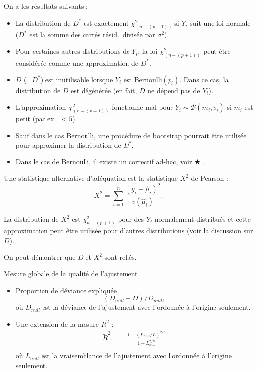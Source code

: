 \documentclass{BeamerTemplate}
\begin{document}
\begin{refsection}
\begin{frame}{}
\end{frame}


\begin{frame}{}
On a les résultats suivants :
\begin{itemize}
\item La distribution de $D^*$ est exactement
$\chi^2_{(n-(p+1))}$ si $Y_i$ suit une loi normale ($D^*$ est la somme des carrés résid.\ 
divisée par $\sigma^2$). 
\item Pour certaines autres distributions de $Y_i$, la loi $\chi^2_{(n-(p+1))}$ peut être considérée
comme une approximation de $D^*$.
\item $D$ (=$D^*$) est inutilisable lorsque $Y_i$ est Bernoulli$(p_i)$. Dans ce cas, la
distribution de $D$ est dégénérée (en fait, $D$ ne dépend pas de $Y_i$).
\item L'approximation $\chi^2_{(n-(p+1))}$ fonctionne mal pour $Y_i \sim {\mathcal
B}(m_i,p_i)$ si $m_i$ est petit (par ex.\ $<5$).
\item Sauf dans le cas Bernoulli, une procédure de
  bootstrap pourrait être
utilisée pour approximer la distribution de $D^*$.
\item Dans le cas de Bernoulli, il existe un correctif ad-hoc, voir {\color{red}
$\bigstar$ \citeN{Hosm:Leme:1980}}.
\end{itemize}
\end{frame}


\begin{frame}{}
Une statistique alternative d'adéquation est la statistique $X^2$ de Pearson :
$$X^2 = \sum_{i=1}^n \frac{(y_i - \hat{\mu}_i)^2}{v(\hat{\mu}_i)}.$$

\bigskip
La distribution de $X^2$ est $\chi^2_{n-(p+1)}$ pour des $Y_i$ normalement distribués et
cette approximation peut être utilisée pour d'autres distributions (voir la discussion sur
$D$).

\bigskip

On peut démontrer que $D$ et $X^2$ sont reliés.
\end{frame}


\begin{frame}{Mesure globale de la qualité de l'ajustement}

\begin{itemize}
\item {\color{blue}Proportion de déviance expliquée}
$$(D_{null}-D)/D_{null},$$
où $D_{null}$ est la déviance de l'ajustement avec l'ordonnée à l'origine seulement.
\item Une {\color{blue}extension de la mesure $R^2$} \cite{Nage:1991} :
\begin{eqnarray*}
\widetilde{R}^2 & = & \frac{1-(L_{null}/L)^{2/n}}{1-L_{null}^{2/n}}\\
\end{eqnarray*}
où $L_{null}$ est la vraisemblance de l'ajustement avec l'ordonnée à l'origine seulement.
\end{itemize}
\end{frame}


\end{refsection}
\end{document}
